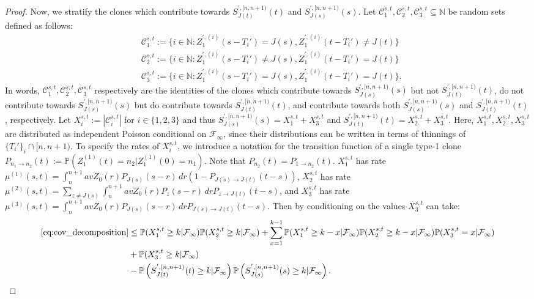 \documentclass{article}
\numberwithin{equation}{section}
\begin{document}
\begin{proof}
  Now, we stratify the clones which contribute towards $S_{J(t)}^{',[n,n+1)}(t)$ and $S_{J(s)}^{',[n,n+1)}(s)$. Let $\mathcal{C}_1^{s,t},\mathcal{C}_2^{s,t},\mathcal{C}_3^{s,t}\subseteq \mathbb{N}$ be random sets defined as follows:
  \begin{align*}
    &\mathcal{C}_1^{s,t}:=\{i\in \mathbb{N}:Z_1^{',(i)}(s-T_i')=J(s),Z_1^{',(i)}(t-T_i')\neq J(t)\}\\
    &\mathcal{C}_2^{s,t}:=\{i\in \mathbb{N}:Z_1^{',(i)}(s-T_i')\neq J(s),Z_1^{',(i)}(t-T_i')= J(t)\}\\
    &\mathcal{C}_3^{s,t}:=\{i\in \mathbb{N}:Z_1^{',(i)}(s-T_i')=J(s),Z_1^{',(i)}(t-T_i')= J(t)\}.
  \end{align*}
  In words, $\mathcal{C}_1^{s,t},\mathcal{C}_2^{s,t},\mathcal{C}_3^{s,t}$ respectively are the identities of the clones which contribute towards $S_{J(s)}^{',[n,n+1)}(s)$ but not $S_{J(t)}^{',[n,n+1)}(t)$, do not contribute towards $S_{J(s)}^{',[n,n+1)}(s)$ but do contribute towards $S_{J(t)}^{',[n,n+1)}(t)$, and contribute towards both $S_{J(s)}^{',[n,n+1)}(s)$ and $S_{J(t)}^{',[n,n+1)}(t)$, respectively. Let $X_i^{s,t}:=|\mathcal{C}_i^{s,t}|$ for $i\in \{1,2,3\}$ and thus $S_{J(s)}^{',[n,n+1)}(s)=X_1^{s,t}+X_3^{s,t}$ and $S_{J(t)}^{',[n,n+1)}(t)=X_2^{s,t}+X_3^{s,t}$. Here, $X_1^{s,t},X_2^{s,t},X_3^{s,t}$ are distributed as independent Poisson conditional on $\mathcal{F}_\infty$, since their distributions can be written in terms of thinnings of $\{T_i'\}_i\cap [n,n+1)$. To specify the rates of $X_i^{s,t}$, we introduce a notation for the transition function of a single type-1 clone $P_{n_1\to n_2}(t):=\mathbb{P}(Z_1^{(1)}(t)=n_2|Z_1^{(1)}(0)=n_1)$. Note that $P_{n_2}(t)=P_{1\to n_2}(t)$. $X_1^{s,t}$ has rate $\mu^{(1)}(s,t)=\int_n^{n+1}avZ_0(r)P_{J(s)}(s-r)\,dr(1-P_{J(s)\to J(t)}(t-s))$, $X_2^{s,t}$ has rate $\mu^{(2)}(s,t)=\sum_{z\neq J(s)}\int_n^{n+1}avZ_0(r)P_{z}(s-r)\,drP_{z\to J(t)}(t-s)$, and $X_3^{s,t}$ has rate $\mu^{(3)}(s,t)=\int_n^{n+1}avZ_0(r)P_{J(s)}(s-r)\,dr P_{J(s)\to J(t)}(t-s)$. Then by conditioning on the values $X_3^{s,t}$ can take:
  \begin{align*}
    \ref{eq:cov_decomposition}&\leq \mathbb{P}(X_1^{s,t}\geq k|\mathcal{F}_\infty)\mathbb{P}(X_2^{s,t}\geq k|\mathcal{F}_\infty)+\sum_{x=1}^{k-1}\mathbb{P}(X_1^{s,t}\geq k-x|\mathcal{F}_\infty)\mathbb{P}(X_2^{s,t}\geq k-x|\mathcal{F}_\infty)\mathbb{P}(X_3^{s,t}=x|\mathcal{F}_\infty)\\
    &+\mathbb{P}(X_3^{s,t}\geq k|\mathcal{F}_\infty)\\
    &-\mathbb{P}\left(S_{J(t)}^{',[n,n+1)}(t)\geq k|\mathcal{F}_\infty\right)\mathbb{P}\left(S_{J(s)}^{',[n,n+1)}(s)\geq k|\mathcal{F}_\infty\right).
  \end{align*}


\end{proof}
\end{document}
